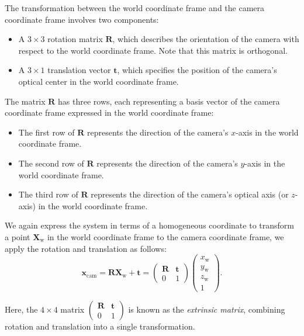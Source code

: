 \documentclass[12pt]{article}
\begin{document}
The transformation between the world coordinate frame and the camera coordinate frame involves two components:
\begin{itemize}
    \item A $3 \times 3$ rotation matrix $\mathbf{R}$, which describes the orientation of the camera with respect to the world coordinate frame. Note that this matrix is orthogonal.
    \item A $3 \times 1$ translation vector $\mathbf{t}$, which specifies the position of the camera's optical center in the world coordinate frame.
\end{itemize}

The matrix $\mathbf{R}$ has three rows, each representing a basis vector of the camera coordinate frame expressed in the world coordinate frame:
\begin{itemize}
    \item The first row of $\mathbf{R}$ represents the direction of the camera's $x$-axis in the world coordinate frame.
    \item The second row of $\mathbf{R}$ represents the direction of the camera's $y$-axis in the world coordinate frame.
    \item The third row of $\mathbf{R}$ represents the direction of the camera's optical axis (or $z$-axis) in the world coordinate frame.
\end{itemize}

We again express the system in terms of a homogeneous coordinate to transform a point $\mathbf{X}_{\text{w}}$ in the world coordinate frame to the camera coordinate frame, we apply the rotation and translation as follows:
$$
\mathbf{x}_\text{cam} = 
\mathbf{R} \mathbf{X}_{\text{w}} + \mathbf{t} =
\begin{pmatrix} 
\mathbf{R} & \mathbf{t} \\
0 & 1
\end{pmatrix}
\begin{pmatrix} x_{\text{w}} \\ y_{\text{w}} \\ z_{\text{w}} \\ 1 \end{pmatrix}.
$$

Here, the $4\times 4$ matrix $
\begin{pmatrix} 
\mathbf{R} & \mathbf{t} \\
0 & 1
\end{pmatrix}
$
is known as the \textit{extrinsic matrix}, combining rotation and translation into a single transformation.
\end{document}
